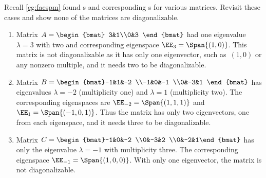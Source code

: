 \begin{example} \label{eg:faespmp}
Recall \autoref{eg:faespm} found s and corresponding s for various matrices.
Revisit these cases and show none of the matrices are diagonalizable.
\begin{enumerate}
\item Matrix \(A=\begin{bmat} 3&1\\0&3 \end{bmat}\) had one eigenvalue \(\lambda=3\) with  two and corresponding eigenspace \(\EE_3=\Span\{(1,0)\}\).
This matrix is not diagonalizable as it has only one  eigenvector, such as~\((1,0)\) or any nonzero multiple, and it needs two to be diagonalizable. 

\item Matrix \(B=\begin{bmat}-1&1&-2
\\-1&0&-1
\\0&-3&1 \end{bmat}\)
has eigenvalues  \(\lambda=-2\) (multiplicity one) and \(\lambda=1\) (multiplicity two).
The corresponding eigenspaces are \(\EE_{-2}=\Span\{(1,1,1)\}\) and \(\EE_{1}=\Span\{(-1,0,1)\}\).
Thus the matrix has only two  eigenvectors, one from each eigenspace, and it needs three to be diagonalizable.

\item Matrix \(C=\begin{bmat}-1&0&-2
\\0&-3&2
\\0&-2&1\end{bmat}\)
has only the eigenvalue \(\lambda=-1\) with multiplicity three.
The corresponding eigenspace \(\EE_{-1}=\Span\{(1,0,0)\}\).
With only one  eigenvector, the matrix is not diagonalizable.

\end{enumerate}
\end{example}



